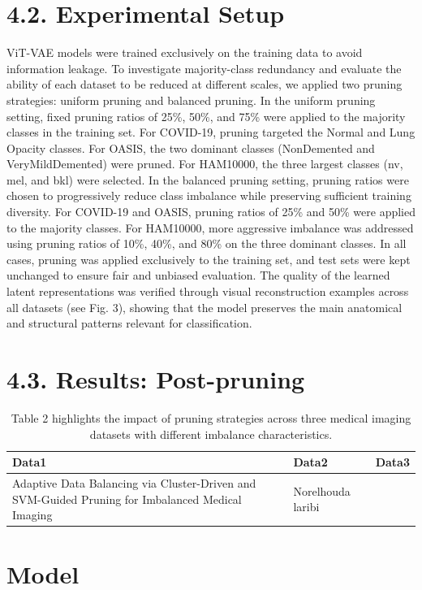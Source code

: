 \documentclass[final,5p,times,twocolumn,authoryear]{elsarticle}
\begin{document}
\section{4.2. Experimental Setup}
ViT-VAE models were trained exclusively on the training data to avoid information leakage. To investigate majority-class redundancy and evaluate the ability of each dataset to be reduced at different scales, we applied two pruning strategies: uniform pruning and balanced pruning.
In the uniform pruning setting, fixed pruning ratios of 25\%, 50\%, and 75\% were applied to the majority classes in the training set. For COVID-19, pruning targeted the Normal and Lung Opacity classes. For OASIS, the two dominant classes (NonDemented and VeryMildDemented) were pruned. For HAM10000, the three largest classes (nv, mel, and bkl) were selected. In the balanced pruning setting, pruning ratios were chosen to progressively reduce class imbalance while preserving sufficient training diversity. For COVID-19 and OASIS, pruning ratios of 25\% and 50\% were applied to the majority classes. For HAM10000, more aggressive imbalance was addressed using pruning ratios of 10\%, 40\%, and 80\% on the three dominant classes.
In all cases, pruning was applied exclusively to the training set, and test sets were kept unchanged to ensure fair and unbiased evaluation. The quality of the learned latent representations was verified through visual reconstruction examples across all datasets (see Fig. 3), showing that the model preserves the main anatomical and structural patterns relevant for classification.
\section{4.3. Results: Post-pruning}
\begin{table}[htbp]
\centering
\caption{Table 2 highlights the impact of pruning strategies across three medical imaging datasets with different imbalance characteristics.}
\begin{tabular}{lll}
\hline
Data1 & Data2 & Data3 \\
\hline
Adaptive Data Balancing via Cluster-Driven and SVM-Guided Pruning for Imbalanced Medical Imaging & Norelhouda laribi & \\
\hline
\end{tabular}
\end{table}

\section{Model}
\end{document}
